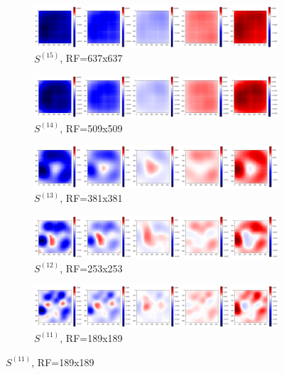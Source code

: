 \documentclass[preprint]{elsarticle}
\theoremstyle{definition} %
\theoremstyle{remark}
\begin{document}
\begin{figure}[h!]
	\centering
	\begin{subfigure}[b]{\textwidth}
		\includegraphics[width=\textwidth]{figures/score_prop_23713_left/score_rf637.png}
		\caption{$S^{(15)}$, RF=637x637}
		\label{fig:score_rf637}
	\end{subfigure}
	
	\begin{subfigure}[b]{\textwidth}
		\includegraphics[width=\textwidth]{figures/score_prop_23713_left/score_rf509.png}
		\caption{$S^{(14)}$, RF=509x509}
		\label{fig:score_rf509}
	\end{subfigure}
	
	\begin{subfigure}[b]{\textwidth}
		\includegraphics[width=\textwidth]{figures/score_prop_23713_left/score_rf381.png}
		\caption{$S^{(13)}$, RF=381x381}
		\label{fig:score_rf381}
	\end{subfigure}
	
	\begin{subfigure}[b]{\textwidth}
		\includegraphics[width=\textwidth]{figures/score_prop_23713_left/score_rf253.png}
		\caption{$S^{(12)}$, RF=253x253}
		\label{fig:score_rf253}
	\end{subfigure}
	
	\begin{subfigure}[b]{\textwidth}
		\includegraphics[width=\textwidth]{figures/score_prop_23713_left/score_rf189.png}
		\caption{$S^{(11)}$, RF=189x189}
		\label{fig:score_rf189}
	\end{subfigure}
	

\end{figure}
\end{document}
